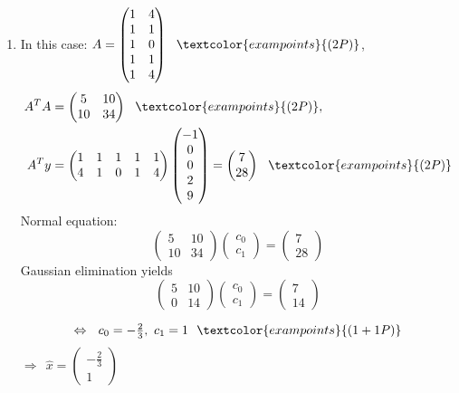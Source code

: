 {\color{solution}
\begin{enumerate}
		\item In this case: $A=
	\begin{pmatrix}
	1&4\\
	1&1\\
	1&0\\
	1&1\\
	1&4
	\end{pmatrix}~~\textcolor{exampoints}{(2P)}$,
	\begin{align*}
	A^TA&=\begin{pmatrix}5&10\\10&34\end{pmatrix}~~\textcolor{exampoints}{(2P)},\\
	A^Ty&=\begin{pmatrix}1&1&1&1&1\\4&1&0&1&4\end{pmatrix}
	\begin{pmatrix}-1\\0\\0\\2\\9\end{pmatrix}
	=\begin{pmatrix}7\\28\end{pmatrix}~~\textcolor{exampoints}{(2P)}
	\end{align*}
	Normal equation: 
	$$\begin{pmatrix}5&10\\10&34\end{pmatrix}\begin{pmatrix}c_0\\c_1\end{pmatrix}
	=\begin{pmatrix}7\\28\end{pmatrix}$$
	Gaussian elimination yields
	$$\begin{pmatrix}5&10\\0&14\end{pmatrix}\begin{pmatrix}c_0\\c_1\end{pmatrix}
	=\begin{pmatrix}7\\14\end{pmatrix}$$
	
	$$\Leftrightarrow~~c_0=-\tfrac{2}{3},~c_1=1~~\textcolor{exampoints}{(1+1P)}$$
	$\Rightarrow~~\hat{x}=\begin{pmatrix}-\tfrac{2}{3}\\1\end{pmatrix}$

\end{enumerate}
}
